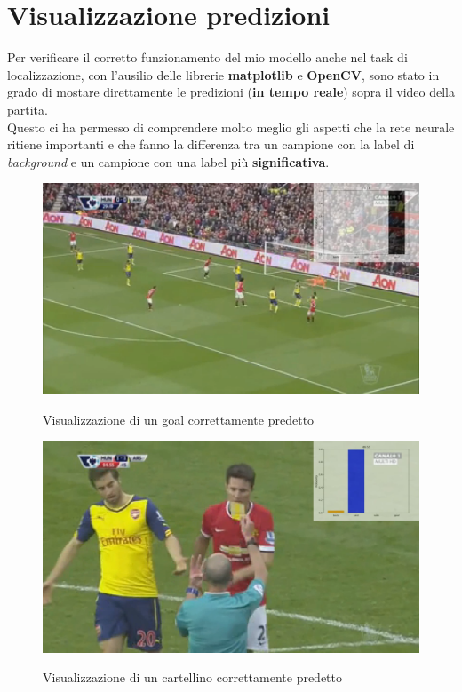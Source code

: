 \section{Visualizzazione predizioni}
Per verificare il corretto funzionamento del mio modello anche nel task di localizzazione, con l'ausilio delle librerie \textbf{matplotlib} e \textbf{OpenCV}, sono stato in grado di mostare direttamente le predizioni (\textbf{in tempo reale}) sopra il video della partita.
\\Questo ci ha permesso di comprendere molto meglio gli aspetti che la rete neurale ritiene importanti e che fanno la differenza tra un campione con la label di \textit{background} e un campione con una label più \textbf{significativa}.

\begin{figure}[ht]
\centering
\caption{Visualizzazione di un goal correttamente predetto}
\includegraphics[width=\linewidth]{img/videogoal.png}
\label{figure : videogoal}
\end{figure}
\begin{figure}[H]
\centering
\caption{Visualizzazione di un cartellino correttamente predetto}
\includegraphics[width=\linewidth]{img/videocard.png}
\label{figure : videocard}
\end{figure}
